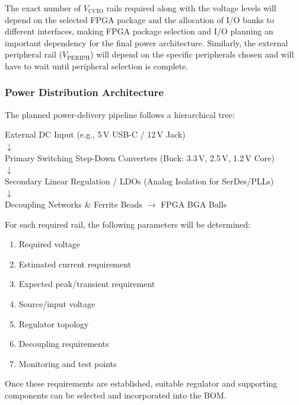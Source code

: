 \documentclass[12pt,a4paper]{article}
\begin{document}
The exact number of $V_{\text{CCIO}}$ rails required along with the voltage levels will depend on the selected FPGA package and the allocation of I/O banks to different interfaces, making FPGA package selection and I/O planning an important dependency for the final power architecture. Similarly, the external peripheral rail ($V_{\text{PERIPH}}$) will depend on the specific peripherals chosen and will have to wait until peripheral selection is complete.

\subsubsection{Power Distribution Architecture}
The planned power-delivery pipeline follows a hierarchical tree:
\begin{center}
External DC Input (e.g., 5\,V USB-C / 12\,V Jack)\\
$\downarrow$\\
Primary Switching Step-Down Converters (Buck: 3.3\,V, 2.5\,V, 1.2\,V Core)\\
$\downarrow$\\
Secondary Linear Regulation / LDOs (Analog Isolation for SerDes/PLLs)\\
$\downarrow$\\
Decoupling Networks \& Ferrite Beads $\rightarrow$ FPGA BGA Balls
\end{center}

For each required rail, the following parameters will be determined:
\begin{enumerate}[leftmargin=1.5cm]
    \item Required voltage
    \item Estimated current requirement
    \item Expected peak/transient requirement
    \item Source/input voltage
    \item Regulator topology
    \item Decoupling requirements
    \item Monitoring and test points
\end{enumerate}

Once these requirements are established, suitable regulator and supporting components can be selected and incorporated into the BOM.
\end{document}
